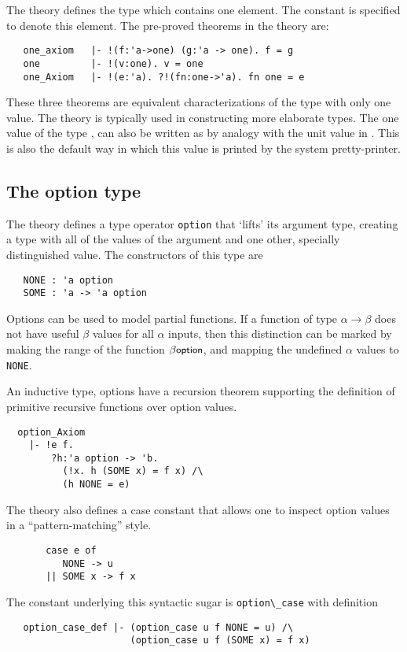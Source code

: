 The theory  defines  the type   which  contains one element.
The constant    is specified  to denote  this element.   The pre-proved
theorems in the theory  are:

\begin{hol}
\begin{verbatim}
   one_axiom   |- !(f:'a->one) (g:'a -> one). f = g
   one         |- !(v:one). v = one
   one_Axiom   |- !(e:'a). ?!(fn:one->'a). fn one = e
\end{verbatim}
\end{hol}

\noindent These three theorems are equivalent characterizations of the type
with only one value. The theory  is typically used in
constructing more elaborate types.  The one value of the type
, can also be written as \ml{()} by analogy with the unit
value in \ML.  This is also the default way in which this value is
printed by the system pretty-printer.

\subsection{The option type}

The theory  defines a type operator \verb+option+
that `lifts' its argument type, creating a type with all of the
values of the argument and one other, specially distinguished value.
The constructors of this type are
\begin{verbatim}
   NONE : 'a option
   SOME : 'a -> 'a option
\end{verbatim}
Options can be used to model partial functions.  If a function of type
$\alpha\rightarrow\beta$ does not have useful $\beta$ values for all
$\alpha$ inputs, then this distinction can be marked by making the
range of the function $\beta\mbox{\small{\textbf{\sf{option}}}}$, and mapping the
undefined $\alpha$ values to {\small\verb+NONE+}.

An inductive type, options have a recursion theorem supporting the
definition of primitive recursive functions over option values.
%
{\small
\begin{verbatim}
  option_Axiom
    |- !e f.
        ?h:'a option -> 'b.
          (!x. h (SOME x) = f x) /\
          (h NONE = e)
\end{verbatim}
}
The  theory also defines a case constant that allows
one to inspect option values in a ``pattern-matching'' style.
{\small
\begin{verbatim}
       case e of
          NONE -> u
       || SOME x -> f x
\end{verbatim}
}
The constant underlying this syntactic sugar is \verb+option\_case+
with definition
{\small
\begin{verbatim}
   option_case_def |- (option_case u f NONE = u) /\
                      (option_case u f (SOME x) = f x)
\end{verbatim}}

